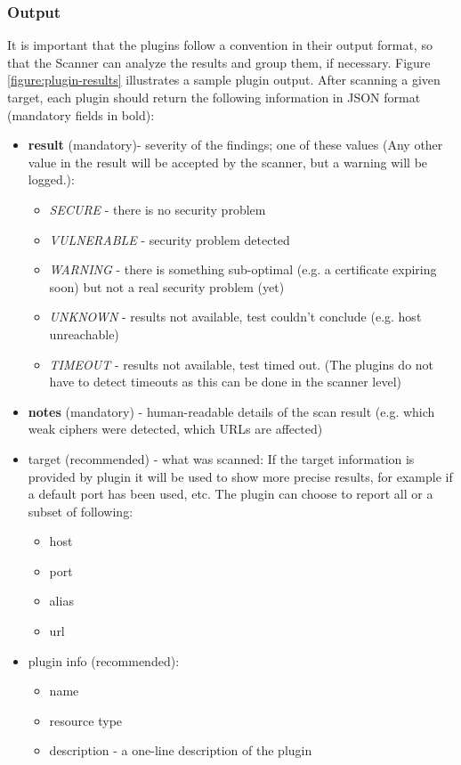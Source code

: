 \subsubsection{Output}
It is important that the plugins follow a convention in their output format, so that the Scanner can analyze the results and group them, if necessary. Figure \ref{figure:plugin-results} illustrates a sample plugin output. After scanning a given target, each plugin should return the following information in JSON format (mandatory fields in bold): 
\begin{itemize}


   \item \textbf{result} (mandatory)- severity of the findings; one of these values (Any other value in the result will be accepted by the scanner, but a warning will be logged.):
    \begin{itemize}
    

        \item \textit{SECURE} - there is no security problem
        \item  \textit{VULNERABLE} - security problem detected
        \item  \textit{WARNING} - there is something sub-optimal (e.g. a certificate expiring soon) but not a real security problem (yet)
        \item  \textit{UNKNOWN} - results not available, test couldn't conclude (e.g. host unreachable)
        \item  \textit{TIMEOUT} - results not available, test timed out. (The plugins do not have to detect timeouts as this can be done in the scanner level) 
            \end{itemize}
\item      \textbf{notes} (mandatory) - human-readable details of the scan result (e.g. which weak ciphers were detected, which URLs are affected)
\item      target (recommended) - what was scanned: If the target information is provided by plugin it will be used to show more precise results, for example if a default port has been used, etc. The plugin can choose to report all or a subset of following:
\begin{itemize}


\item        host
\item    port
\item    alias
\item    url 
\end{itemize}
\item    plugin info (recommended):
\begin{itemize}
\item        name
\item    resource type
\item    description - a one-line description of the plugin 
\end{itemize}
\end{itemize}


